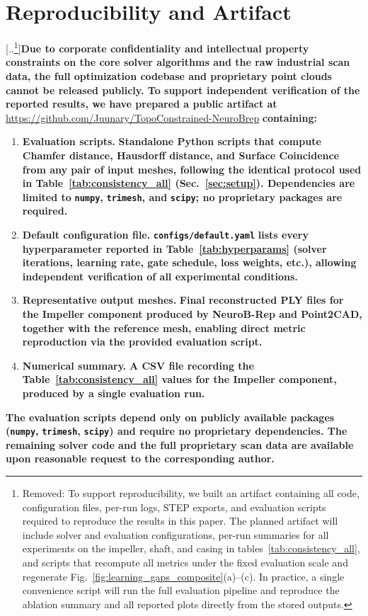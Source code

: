 \documentclass{ieeeaccess}
\providecommand{\DIFaddtex}[1]{{\color{blue}\bfseries #1}} %
\providecommand{\DIFdeltex}[1]{{\color{red}[..\footnote{\color{black}Removed: #1}]}} %
\providecommand{\DIFaddbegin}{} %
\providecommand{\DIFaddend}{} %
\providecommand{\DIFdelbegin}{} %
\providecommand{\DIFdelend}{} %
\providecommand{\DIFadd}[1]{\texorpdfstring{\DIFaddtex{#1}}{#1}} %
\providecommand{\DIFdel}[1]{\texorpdfstring{\DIFdeltex{#1}}{}} %
\begin{document}
\DIFaddend \section{Reproducibility and Artifact}
\label{sec:artifact}
\DIFdelbegin \DIFdel{To support reproducibility, we built an artifact containing all code,
configuration files, per-run logs, STEP exports, and evaluation scripts required
to reproduce the results in this paper. The planned artifact will include solver
and evaluation configurations, per-run summaries for all experiments on the
impeller, shaft, and casing in tables~\ref{tab:consistency_all}, and scripts that recompute all metrics
under the fixed evaluation scale and regenerate Fig.~\ref{fig:learning_gaps_composite}(a)--(c). In practice, a
single convenience script will run the full evaluation pipeline and reproduce the
ablation summary and all reported plots directly from the stored outputs.}\DIFdelend \DIFaddbegin \DIFadd{Due to corporate confidentiality and intellectual property constraints
on the core solver algorithms and the raw industrial scan data,
the full optimization codebase and proprietary point clouds cannot be
released publicly.
To support independent verification of the reported results, we have
prepared a public artifact at
}\url{https://github.com/Juunary/TopoConstrained-NeuroBrep}\DIFadd{
containing:
}\begin{enumerate}
  \item \textbf{\DIFadd{Evaluation scripts.}} \DIFadd{Standalone Python scripts that compute
        Chamfer distance, Hausdorff distance, and Surface Coincidence
        from any pair of input meshes, following the identical protocol
        used in Table~\ref{tab:consistency_all} (Sec.~\ref{sec:setup}).
        Dependencies are limited to }\texttt{\DIFadd{numpy}}\DIFadd{, }\texttt{\DIFadd{trimesh}}\DIFadd{,
        and }\texttt{\DIFadd{scipy}}\DIFadd{; no proprietary packages are required.}
  \item \textbf{\DIFadd{Default configuration file.}}
        \texttt{\DIFadd{configs/default.yaml}} \DIFadd{lists every hyperparameter reported
        in Table~\ref{tab:hyperparams} (solver iterations, learning rate,
        gate schedule, loss weights, etc.), allowing independent
        verification of all experimental conditions.}
  \item \textbf{\DIFadd{Representative output meshes.}} \DIFadd{Final reconstructed PLY files
        for the Impeller component produced by NeuroB-Rep and Point2CAD,
        together with the reference mesh, enabling direct metric
        reproduction via the provided evaluation script.}
  \item \textbf{\DIFadd{Numerical summary.}} \DIFadd{A CSV file recording the
        Table~\ref{tab:consistency_all} values for the Impeller component,
        produced by a single evaluation run.}
\end{enumerate}
\DIFadd{The evaluation scripts depend only on publicly available packages
(}\texttt{\DIFadd{numpy}}\DIFadd{, }\texttt{\DIFadd{trimesh}}\DIFadd{, }\texttt{\DIFadd{scipy}}\DIFadd{) and require no
proprietary dependencies.
The remaining solver code and the full proprietary scan data are
available upon reasonable request to the corresponding author.}\DIFaddend
\end{document}
